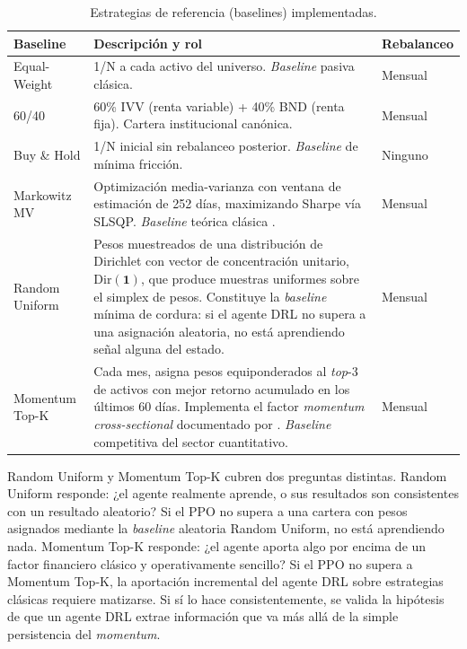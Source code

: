 \documentclass[IB,a4paper]{TFUOC}
\begin{document}
\begin{table}[h]
\centering
\renewcommand{\arraystretch}{1.25}
\begin{tabular}{|l|p{8.5cm}|p{2.0cm}|}
\hline
\textbf{Baseline} & \textbf{Descripción y rol} & \textbf{Rebalanceo} \\ \hline
Equal-Weight & 1/N a cada activo del universo. \textit{Baseline} pasiva clásica. & Mensual \\ \hline
60/40 & 60\% IVV (renta variable) + 40\% BND (renta fija). Cartera institucional canónica. & Mensual \\ \hline
Buy \& Hold & 1/N inicial sin rebalanceo posterior. \textit{Baseline} de mínima fricción. & Ninguno \\ \hline
Markowitz MV & Optimización media-varianza con ventana de estimación de 252 días, maximizando Sharpe vía SLSQP. \textit{Baseline} teórica clásica \citep{markowitz1952}. & Mensual \\ \hline
Random Uniform & Pesos muestreados de una distribución de Dirichlet con vector de concentración unitario, $\mathrm{Dir}(\mathbf{1})$, que produce muestras uniformes sobre el simplex de pesos. Constituye la \textit{baseline} mínima de cordura: si el agente DRL no supera a una asignación aleatoria, no está aprendiendo señal alguna del estado. & Mensual \\ \hline
Momentum Top-K & Cada mes, asigna pesos equiponderados al \textit{top}-3 de activos con mejor retorno acumulado en los últimos 60 días. Implementa el factor \textit{momentum} \textit{cross-sectional} documentado por \citet{jegadeesh1993}. \textit{Baseline} competitiva del sector cuantitativo. & Mensual \\ \hline
\end{tabular}
\caption{Estrategias de referencia (baselines) implementadas.}
\label{tab:baselines}
\end{table}

Random Uniform y Momentum Top-K cubren dos preguntas distintas. Random Uniform responde: ¿el agente realmente aprende, o sus resultados son consistentes con un resultado aleatorio? Si el PPO no supera a una cartera con pesos asignados mediante la \textit{baseline} aleatoria Random Uniform, no está aprendiendo nada. Momentum Top-K responde: ¿el agente aporta algo por encima de un factor financiero clásico y operativamente sencillo? Si el PPO no supera a Momentum Top-K, la aportación incremental del agente DRL sobre estrategias clásicas requiere matizarse. Si sí lo hace consistentemente, se valida la hipótesis de que un agente DRL extrae información que va más allá de la simple persistencia del \textit{momentum}.
\end{document}
